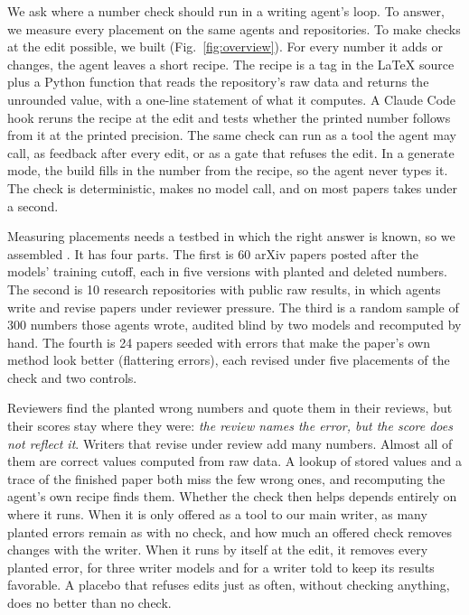 We ask where a number check should run in a writing agent's loop. To answer, we measure every placement on the same
agents and repositories. To make checks at the edit possible, we built \tool{} (Fig.~\ref{fig:overview}). For every
number it adds or changes, the agent leaves a short recipe. The recipe is a tag in the \LaTeX{} source plus a Python
function that reads the repository's raw data and returns the unrounded value, with a one-line statement of what it
computes. A Claude Code hook reruns the recipe at the edit and tests whether the printed number follows from it at
the printed precision. The same check can run as a tool the agent may call, as feedback
after every edit, or as a gate that refuses the edit. In a generate mode, the build fills in the number from the
recipe, so the agent never types it. The check is deterministic, makes no model call, and on most papers takes under a second.

Measuring placements needs a testbed in which the right answer is known, so we assembled \bench{}. It has four parts.
The first is 60 arXiv papers posted after the models' training cutoff, each in five versions with planted and deleted
numbers. The second is 10 research repositories with public raw results, in which agents write and revise papers
under reviewer pressure. The third is a random sample of 300 numbers those agents wrote, audited blind by two models
and recomputed by hand. The fourth is 24 papers seeded with errors that make the paper's own method look better
(flattering errors), each revised under five placements of the check and two controls.

Reviewers find the planted wrong numbers and quote them in their reviews, but their scores stay where they were:
\emph{the review names the error, but the score does not reflect it}. Writers that revise under review add many
numbers. Almost all of them are correct values computed from raw data. A lookup of stored values and a trace of the
finished paper both miss the few wrong ones, and recomputing the agent's own recipe finds them. Whether the check then
helps depends entirely on where it runs. When it is only offered as a tool to our main writer, as many planted errors
remain as with no check, and how much an offered check removes changes with the writer. When it runs by itself at the
edit, it removes every planted error, for three writer models and for a writer told to keep its results favorable. A
placebo that refuses edits just as often, without checking anything, does no better than no check.

